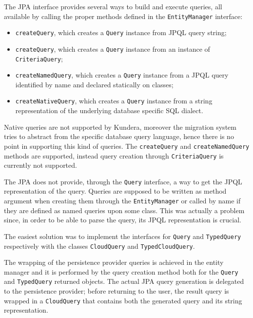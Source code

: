 \noindent The JPA interface provides several ways to build and execute queries, all available by calling the proper methods defined in the \texttt{EntityManager} interface: 
\begin{itemize}
\item \texttt{createQuery}, which creates a \texttt{Query} instance from JPQL query string;
\item \texttt{createQuery}, which creates a \texttt{Query} instance from an instance of \texttt{CriteriaQuery};
\item \texttt{createNamedQuery}, which creates a \texttt{Query} instance from a JPQL query identified by name and declared statically on classes; 
\item \texttt{createNativeQuery}, which creates a \texttt{Query} instance from a string representation of the underlying database specific SQL dialect.
\end{itemize}
 
\noindent Native queries are not supported by Kundera, moreover the migration system tries to abstract from the specific database query language, hence there is no point in supporting this kind of queries. The \texttt{createQuery} and \texttt{createNamedQuery} methods are supported, instead query creation through \texttt{CriteriaQuery} is currently not supported.

\newparagraph The JPA does not provide, through the \texttt{Query} interface, a way to get the JPQL representation of the query. Queries are supposed to be written as method argument when creating them through the \texttt{EntityManager} or called by name if they are defined as named queries upon some class.
This was actually a problem since, in order to be able to parse the query, its JPQL representation is crucial.

\noindent The easiest solution was to implement the interfaces for \texttt{Query} and \texttt{TypedQuery} respectively with the classes \texttt{CloudQuery} and \texttt{TypedCloudQuery}. 

\noindent The wrapping of the persistence provider queries is achieved in the entity manager and it is performed by the query creation method both for the \texttt{Query} and \texttt{TypedQuery} returned objects. The actual JPA query generation is delegated to the persistence provider; before returning to the user, the result query is wrapped in a \texttt{CloudQuery} that contains both the generated query and its string representation.


